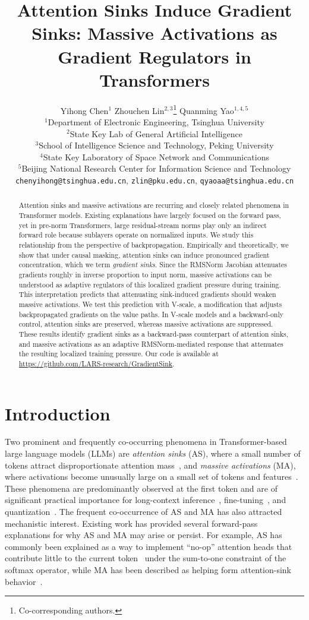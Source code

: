\documentclass{article}
\title{Attention Sinks Induce Gradient Sinks: Massive Activations as Gradient Regulators in Transformers}
\author{
    Yihong Chen$^1$
    \qquad Zhouchen Lin$^{2,3}$\thanks{Co-corresponding authors.}
    \qquad Quanming Yao$^{1,4,5}$\footnotemark[1] \\
    $^1$Department of Electronic Engineering, Tsinghua University \\ 
    $^2$State Key Lab of General Artificial Intelligence \\ 
    $^3$School of Intelligence Science and Technology, Peking University\\
    $^4$State Key Laboratory of Space Network and Communications \\
    $^5$Beijing National Research Center for Information Science and Technology \\
    \texttt{chenyihong@tsinghua.edu.cn}, 
    \quad \texttt{zlin@pku.edu.cn},
    \quad \texttt{qyaoaa@tsinghua.edu.cn}
}
\theoremstyle{plain}
\theoremstyle{definition}
\theoremstyle{remark}
\begin{document}
\maketitle

\begin{abstract}
Attention sinks and massive activations are recurring and closely related phenomena in Transformer models. 
Existing explanations have largely focused on the forward pass, yet in pre-norm Transformers, large residual-stream norms play only an indirect forward role because sublayers operate on normalized inputs.
We study this relationship from the perspective of backpropagation. Empirically and theoretically, we show that under causal masking, attention sinks can induce pronounced gradient concentration, which we term \emph{gradient sinks}. Since the RMSNorm Jacobian attenuates gradients roughly in inverse proportion to input norm, massive activations can be understood as adaptive regulators of this localized gradient pressure during training.
This interpretation predicts that attenuating sink-induced gradients should weaken massive activations. We test this prediction with V-scale, a modification that adjusts backpropagated gradients on the value paths. In V-scale models and a backward-only control, attention sinks are preserved, whereas massive activations are suppressed. These results identify gradient sinks as a backward-pass counterpart of attention sinks, and massive activations as an adaptive RMSNorm-mediated response that attenuates the resulting localized training pressure. Our code is available at \href{https://github.com/LARS-research/GradientSink}{https://github.com/LARS-research/GradientSink}.
\end{abstract}

\section{Introduction}

Two prominent and frequently co-occurring phenomena in Transformer-based large language models (LLMs) are \emph{attention sinks} (AS), where a small number of tokens attract disproportionate attention mass~\cite{xiao2024streamingllm,gu2025when}, and \emph{massive activations} (MA), where activations become unusually large on a small set of tokens and features~\cite{bondarenko2023quantizable,sun2024massive,an2025systematic}. 
These phenomena are predominantly observed at the first token and are of significant practical importance for long-context inference~\cite{xiao2024streamingllm,su2025kvsink}, fine-tuning~\cite{liu2026sinktrack,liu2025all,fu2026attention,liu2026surgery}, and quantization~\cite{xiao2023smoothquant,bondarenko2023quantizable}. The frequent co-occurrence of AS and MA has also attracted mechanistic interest. Existing work has provided several forward-pass explanations for why AS and MA may arise or persist. For example, AS has commonly been explained as a way to implement ``no-op'' attention heads that contribute little to the current token~\cite{gu2025when,barbero2025why,guo2025activedormant} under the sum-to-one constraint of the softmax operator, while MA has been described as helping form attention-sink behavior~\cite{sun2024massive,su2026unveiling,queipo-de-llano2026attention}.
\end{document}
